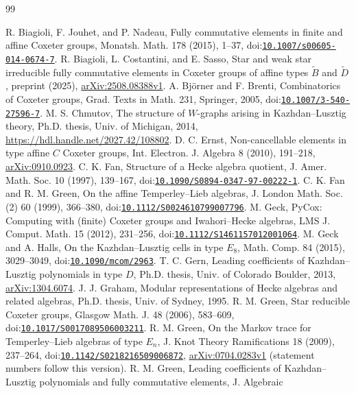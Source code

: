 \documentclass[10pt]{article}
\theoremstyle{remark}
\newcommand{\doi}[1]{doi:\href{https://doi.org/#1}{\nolinkurl{#1}}}
\begin{document}
\begin{thebibliography}{99}\footnotesize\raggedright
\setlength{\itemsep}{0pt}\setlength{\parsep}{0pt}\setlength{\parskip}{0pt}
 R. Biagioli, F. Jouhet, and P. Nadeau, Fully commutative
elements in finite and affine Coxeter groups, Monatsh. Math. 178 (2015),
1--37, \doi{10.1007/s00605-014-0674-7}.
 R. Biagioli, L. Costantini, and E. Sasso,
Star and weak star irreducible fully commutative elements in Coxeter groups
of affine types $\widetilde B$ and $\widetilde D$, preprint (2025),
\href{https://arxiv.org/abs/2508.08388v1}{arXiv:2508.08388v1}.
 A. Bj\"orner and F. Brenti, Combinatorics of Coxeter groups,
Grad. Texts in Math. 231, Springer, 2005, \doi{10.1007/3-540-27596-7}.
 M. S. Chmutov, The structure of $W$-graphs arising in
Kazhdan--Lusztig theory, Ph.D. thesis, Univ. of Michigan, 2014,
\url{https://hdl.handle.net/2027.42/108802}.
 D. C. Ernst, Non-cancellable elements in type affine $C$
Coxeter groups, Int. Electron. J. Algebra 8 (2010), 191--218,
\href{https://arxiv.org/abs/0910.0923}{arXiv:0910.0923}.
 C. K. Fan, Structure of a Hecke algebra quotient,
J. Amer. Math. Soc. 10 (1997), 139--167, \doi{10.1090/S0894-0347-97-00222-1}.
 C. K. Fan and R. M. Green, On the affine
Temperley--Lieb algebras, J. London Math. Soc. (2) 60 (1999), 366--380,
\doi{10.1112/S0024610799007796}.
 M. Geck, PyCox: Computing with (finite) Coxeter groups
and Iwahori--Hecke algebras, LMS J. Comput. Math. 15 (2012), 231--256,
\doi{10.1112/S1461157012001064}.
 M. Geck and A. Halls, On the Kazhdan--Lusztig cells in
type $E_8$, Math. Comp. 84 (2015), 3029--3049, \doi{10.1090/mcom/2963}.
 T. C. Gern, Leading coefficients of Kazhdan--Lusztig
polynomials in type $D$, Ph.D. thesis, Univ. of Colorado Boulder, 2013,
\href{https://arxiv.org/abs/1304.6074}{arXiv:1304.6074}.
 J. J. Graham, Modular representations of Hecke algebras
and related algebras, Ph.D. thesis, Univ. of Sydney, 1995.
 R. M. Green, Star reducible Coxeter groups, Glasgow
Math. J. 48 (2006), 583--609, \doi{10.1017/S0017089506003211}.
 R. M. Green, On the Markov trace for Temperley--Lieb
algebras of type $E_n$, J. Knot Theory Ramifications 18 (2009), 237--264,
\doi{10.1142/S0218216509006872}, \href{https://arxiv.org/abs/0704.0283v1}{arXiv:0704.0283v1}
(statement numbers follow this version).
 R. M. Green, Leading coefficients of
Kazhdan--Lusztig polynomials and fully commutative elements, J. Algebraic

\end{thebibliography}
\end{document}
